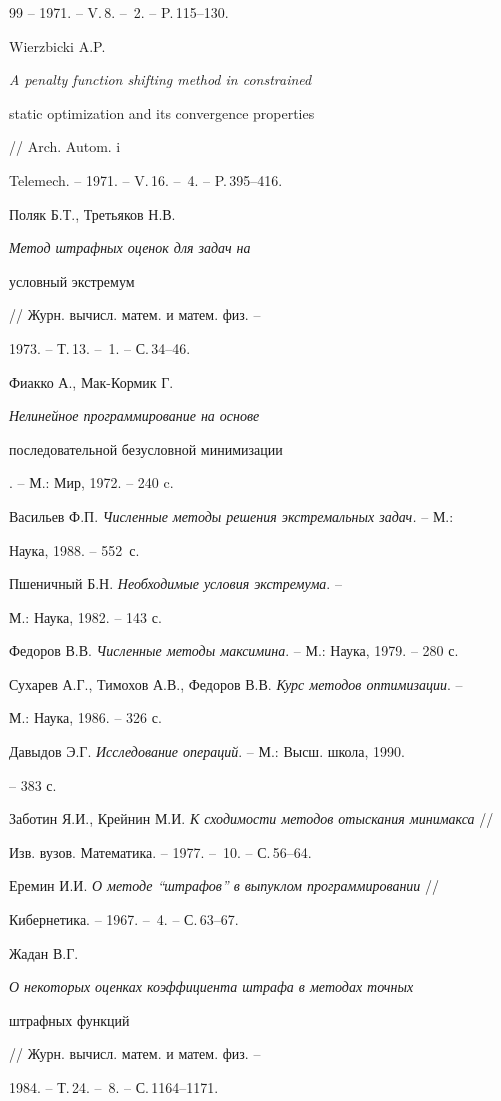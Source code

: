 \begin{thebibliography}{99}
-- 1971. -- V.\,8. -- \No\,2. -- P.\,115--130.




Wierzbicki A.P. {\it A penalty function shifting method in constrained


static optimization and its convergence properties} // Arch. Autom. i 


Telemech. -- 1971. -- V.\,16. -- \No\,4. -- P.\,395--416.




Поляк Б.Т., Третьяков Н.В. {\it Метод штрафных оценок для задач на 


условный экстремум} // Журн. вычисл. матем. и матем. физ. --


1973. -- Т.\,13. -- \No\,1. -- С.\,34--46.




Фиакко А., Мак-Кормик Г. {\it Нелинейное программирование на основе


последовательной безусловной минимизации}. -- М.: Мир, 1972. -- 240 c.




Васильев Ф.П. {\it Численные методы решения экстремальных задач.} -- М.:


Наука, 1988. -- 552~с.




Пшеничный Б.Н. {\it Необходимые условия экстремума}. --


М.: Наука, 1982. -- 143 с. 




Федоров В.В. {\it Численные методы максимина}. -- М.: Наука, 1979. -- 280 с.




Сухарев А.Г., Тимохов А.В., Федоров В.В. {\it Курс методов оптимизации}. --


М.: Наука, 1986. -- 326 с.




Давыдов Э.Г. {\it Исследование операций}. -- М.: Высш. школа, 1990.


-- 383 с. 




Заботин Я.И., Крейнин М.И. {\it К сходимости методов отыскания минимакса} //


Изв. вузов. Математика. -- 1977. -- \No\,10. -- С.\,56--64. 




Еремин И.И. {\it О методе ``штрафов'' в выпуклом программировании} //


Кибернетика. -- 1967. -- \No\,4. -- С.\,63--67.




Жадан В.Г. {\it О некоторых оценках коэффициента штрафа в методах точных


штрафных функций} // Журн. вычисл. матем. и матем. физ. --


1984. -- Т.\,24. -- \No\,8. -- С.\,1164--1171.





\end{thebibliography}
